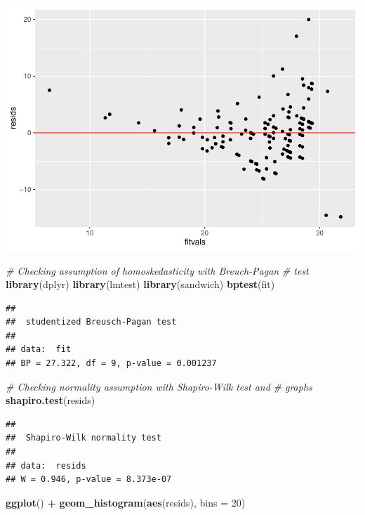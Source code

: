 \documentclass[]{article}
\newenvironment{Shaded}{\begin{snugshade}}{\end{snugshade}}
\newcommand{\KeywordTok}[1]{\textcolor[rgb]{0.13,0.29,0.53}{\textbf{#1}}}
\newcommand{\DataTypeTok}[1]{\textcolor[rgb]{0.13,0.29,0.53}{#1}}
\newcommand{\DecValTok}[1]{\textcolor[rgb]{0.00,0.00,0.81}{#1}}
\newcommand{\StringTok}[1]{\textcolor[rgb]{0.31,0.60,0.02}{#1}}
\newcommand{\CommentTok}[1]{\textcolor[rgb]{0.56,0.35,0.01}{\textit{#1}}}
\newcommand{\OperatorTok}[1]{\textcolor[rgb]{0.81,0.36,0.00}{\textbf{#1}}}
\newcommand{\NormalTok}[1]{#1}
\begin{document}
\begin{center}\includegraphics{project2_files/figure-latex/unnamed-chunk-3-3} \end{center}

\begin{Shaded}
\begin{Highlighting}[]
\CommentTok{# Checking assumption of homoskedasticity with Breuch-Pagan}
\CommentTok{# test}
\KeywordTok{library}\NormalTok{(dplyr)}
\KeywordTok{library}\NormalTok{(lmtest)}
\KeywordTok{library}\NormalTok{(sandwich)}
\KeywordTok{bptest}\NormalTok{(fit)}
\end{Highlighting}
\end{Shaded}

\begin{verbatim}
## 
##  studentized Breusch-Pagan test
## 
## data:  fit
## BP = 27.322, df = 9, p-value = 0.001237
\end{verbatim}

\begin{Shaded}
\begin{Highlighting}[]
\CommentTok{# Checking normality assumption with Shapiro-Wilk test and}
\CommentTok{# graphs}
\KeywordTok{shapiro.test}\NormalTok{(resids)}
\end{Highlighting}
\end{Shaded}

\begin{verbatim}
## 
##  Shapiro-Wilk normality test
## 
## data:  resids
## W = 0.946, p-value = 8.373e-07
\end{verbatim}

\begin{Shaded}
\begin{Highlighting}[]
\KeywordTok{ggplot}\NormalTok{() }\OperatorTok{+}\StringTok{ }\KeywordTok{geom_histogram}\NormalTok{(}\KeywordTok{aes}\NormalTok{(resids), }\DataTypeTok{bins =} \DecValTok{20}\NormalTok{)}
\end{Highlighting}
\end{Shaded}
\end{document}
